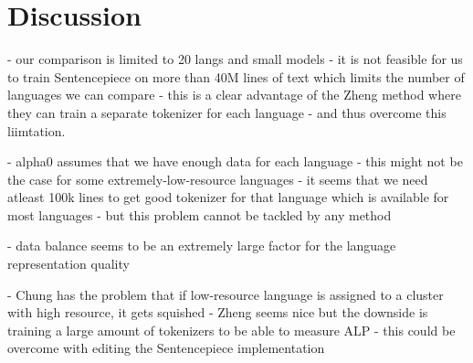 
\chapter{Discussion}

- our comparison is limited to 20 langs and small models
    - it is not feasible for us to train Sentencepiece on more than 40M lines of text which limits the number of languages we can compare
    - this is a clear advantage of the Zheng method where they can train a separate tokenizer for each language - and thus overcome this liimtation.

- alpha0 assumes that we have enough data for each language
    - this might not be the case for some extremely-low-resource languages
    - it seems that we need atleast 100k lines to get good tokenizer for that language which is available for most languages
    - but this problem cannot be tackled by any method

- data balance seems to be an extremely large factor for the language representation quality

- Chung has the problem that if low-resource language is assigned to a cluster with high resource, it gets squished
- Zheng seems nice but the downside is training a large amount of tokenizers to be able to measure ALP - this could be overcome with editing the Sentencepiece implementation